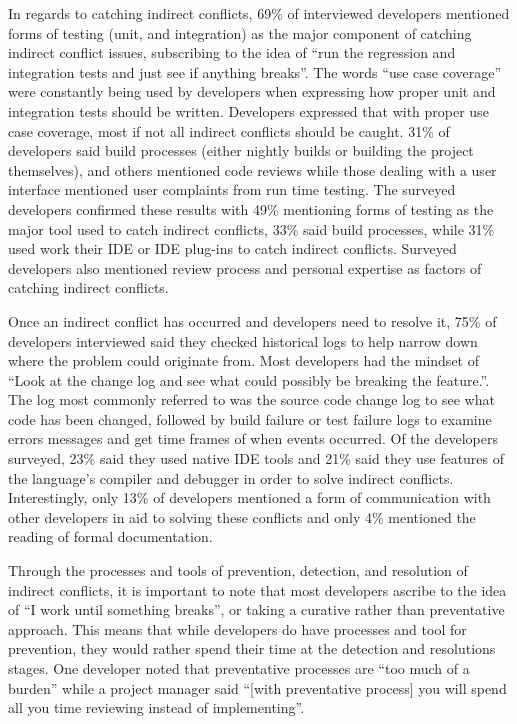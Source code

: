 \documentclass[conference]{IEEEtran}
\begin{document}
In regards to catching indirect conflicts, 69\% of interviewed developers mentioned forms of testing (unit, and integration) 
as the major component of catching indirect conflict issues, subscribing to the idea of ``run the regression and integration 
tests and just see if anything breaks''. The words ``use case coverage'' were constantly being used by developers
when expressing how proper unit and integration tests should be written. Developers expressed that with proper use case coverage, most if
not all indirect conflicts should be caught. 31\% of developers said build processes (either nightly builds or building the project 
themselves), and others mentioned code reviews while those dealing with a user interface mentioned user complaints from run 
time testing. The surveyed developers confirmed these results with 49\% mentioning forms of testing as the major tool used to 
catch indirect conflicts, 33\% said build processes, while 31\% used work their IDE or IDE plug-ins to catch indirect conflicts.
Surveyed developers also mentioned review process and personal expertise as factors of catching indirect conflicts.

Once an indirect conflict has occurred and developers need to resolve it, 75\% of developers interviewed said
they checked historical logs to help narrow down where the problem could originate from. Most developers had the mindset of
``Look at the change log and see what could possibly be breaking the feature.''. The log most commonly referred to was the source
code change log to see what code has been changed, followed by build failure or test failure logs to examine errors messages and get time 
frames of when events occurred. Of the developers surveyed, 23\% said they used native IDE tools and 21\% said they use 
features of the language's compiler and debugger in order to solve indirect conflicts. Interestingly, only 13\% of developers 
mentioned a form of communication with other developers in aid to solving these conflicts and only 4\% mentioned the reading 
of formal documentation.

Through the processes and tools of prevention, detection, and resolution of indirect conflicts, it is important to note that
most developers ascribe to the idea of ``I work until something breaks'', or taking a curative rather than preventative
approach. This means that while developers do have processes and tool for prevention, they would rather spend their time
at the detection and resolutions stages. One developer noted that preventative processes are ``too much of a burden''
while a project manager said ``[with preventative process] you will spend all you time reviewing instead of implementing''. 
\end{document}
